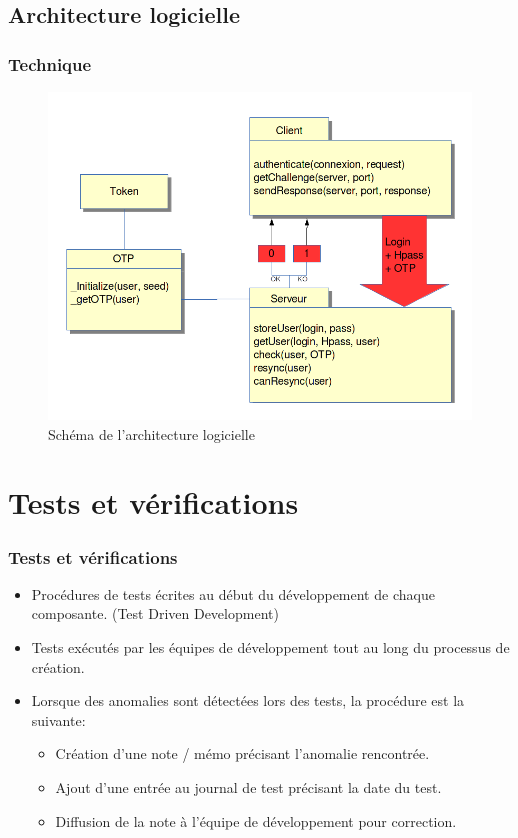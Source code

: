\documentclass[xcolor=table]{beamer}
\begin{document}
\subsection{Architecture logicielle}
\begin{frame}
\frametitle{Technique}
\begin{figure}
 \includegraphics[scale=0.3]{img/architecture.png} 
 \caption{Schéma de l'architecture logicielle}
\end{figure}

\end{frame}


\section{Tests et vérifications}

\begin{frame}
  \frametitle{Tests et vérifications}
  \begin{itemize}
   \item Procédures de tests écrites au début du développement de chaque composante. (Test Driven Development)
   \item Tests exécutés par les équipes de développement tout au long du processus de création.
   \item  Lorsque des anomalies sont détectées lors des tests, la procédure est la suivante:
    \begin{itemize}
     \item Création d'une note / mémo précisant l'anomalie rencontrée.
     \item Ajout d'une entrée au journal de test précisant la date du test.
     \item Diffusion de la note à l'équipe de développement pour correction.
    \end{itemize}
  \end{itemize}
\end{frame}
\end{document}
